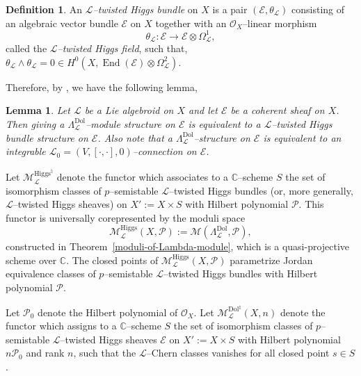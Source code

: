 \documentclass[12pt,reqno]{amsart}
\numberwithin{equation}{subsection}
\newtheorem{lem}[equation]{Lemma}
\theoremstyle{definition}
\newtheorem{defn}[equation]{Definition}
\theoremstyle{theorem}
\begin{document}
\begin{defn}\label{def:L-twisted-Higgs bundle}
An \textit{$\mathcal{L}$--twisted Higgs bundle} on $X$ is a pair $(\mathcal{E},\theta_{\mathcal{L}})$ consisting of an algebraic vector bundle $\mathcal{E}$ on $X$ together with an $\mathcal{O}_{X}$--linear morphism
\[
\theta_{\mathcal{L}} : \mathcal{E} \longrightarrow \mathcal{E} \otimes \Omega^{1}_{\mathcal{L}},
\]
called the \emph{$\mathcal{L}$--twisted Higgs field}, such that, 
$
\theta_{\mathcal{L}} \wedge \theta_{\mathcal{L}} = 0 \in H^{0}\!\left(X, \operatorname{End}(\mathcal{E})\otimes \Omega^{2}_{\mathcal{L}}\right).
$\end{defn}
Therefore, by \cite[lemma 2.13]{CT.Simpson-1994}, we have the following lemma,
\begin{lem}\label{lem: Lambda module structure--equivalent to L twisted Higgs bundle} Let $\mathcal{L}$ be a Lie algebroid on $X$ and let $\mathcal{E}$ be a coherent sheaf on $X$. Then giving a $\Lambda^{\text{Dol}}_{\mathcal{L}}$--module structure on $\mathcal{E}$ is equivalent to a $\mathcal{L}$--twisted Higgs bundle structure on $\mathcal{E}$. Also note that a $\Lambda^{\text{Dol}}_{\mathcal{L}}$--structure on $\mathcal{E}$ is equivalent to an integrable $\mathcal{L}_{0}=(V,[\cdot,\cdot],0)$--connection on $\mathcal{E}$.
\end{lem}


Let $\mathcal{M}^{\mathrm{Higgs}^{\natural}}_{\mathcal{L}}$ denote the
functor which associates to a $\mathbb{C}$--scheme $S$ the set of
isomorphism classes of $p$--semistable $\mathcal{L}$--twisted Higgs
bundles (or, more generally, $\mathcal{L}$--twisted Higgs sheaves) on
$X' := X \times S$ with Hilbert polynomial $\mathcal{P}$. This functor is
universally corepresented by the moduli space
\[
\mathcal{M}^{\mathrm{Higgs}}_{\mathcal{L}}(X,\mathcal{P})
:= \mathcal{M}\!\left(\Lambda^{\mathrm{Dol}}_{\mathcal{L}}, \mathcal{P}\right),
\]
constructed in Theorem~\eqref{moduli-of-Lambda-module}, which is a
quasi-projective scheme over $\mathbb{C}$. The closed points of
$\mathcal{M}^{\mathrm{Higgs}}_{\mathcal{L}}(X,\mathcal{P})$ parametrize Jordan
equivalence classes of $p$--semistable $\mathcal{L}$--twisted Higgs
bundles with Hilbert polynomial $\mathcal{P}$.

Let $\mathcal{P}_{0}$ denote the Hilbert polynomial of $\mathcal{O}_{X}$.
Let $\mathcal{M}^{\mathrm{Dol}^{\natural}}_{\mathcal{L}}(X,n)$ denote the
functor which assigns to a $\mathbb{C}$--scheme $S$ the set of
isomorphism classes of $p$--semistable $\mathcal{L}$--twisted Higgs sheaves $\mathcal{E}$ on $X' := X \times S$ with Hilbert polynomial
$n\mathcal{P}_{0}$ and rank $n$, such that the $\mathcal{L}$--Chern classes vanishes for all closed point $s\in S$. 
\end{document}
